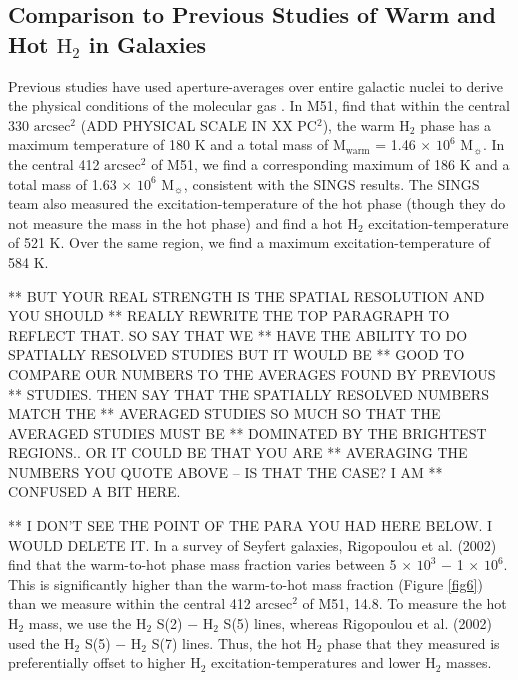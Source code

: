 \documentclass[manuscript]{aastex}
\begin{document}
\subsection{Comparison to Previous Studies of Warm and Hot $\mathrm{H_2}$ in Galaxies}

Previous studies have used aperture-averages over entire galactic
nuclei to derive the physical conditions of the molecular gas
\citep{rig02, hig06, rou07}.  In M51, \citet{rou07} find that within
the central 330 $\mathrm{arcsec^2}$ (ADD PHYSICAL SCALE IN XX PC$^2$),
the warm $\mathrm{H_2}$ phase has a maximum temperature of 180 K and a
total mass of $\mathrm{M_{warm}}$ = 1.46 $\times$ $\mathrm{10^6}$
$\mathrm{M_\sun}$.  In the central 412 $\mathrm{arcsec^2}$ of M51, we
find a corresponding maximum of 186 K and a total mass of 1.63
$\times$ $\mathrm{10^6}$ $\mathrm{M_\sun}$, consistent with the SINGS
results.  The SINGS team also measured the excitation-temperature of
the hot phase (though they do not measure the mass in the hot phase)
and find a hot $\mathrm{H_2}$ excitation-temperature of 521 K.  Over
the same region, we find a maximum excitation-temperature of 584 K.

** BUT YOUR REAL STRENGTH IS THE SPATIAL RESOLUTION AND YOU SHOULD
** REALLY REWRITE THE TOP PARAGRAPH TO REFLECT THAT.  SO SAY THAT WE
** HAVE THE ABILITY TO DO SPATIALLY RESOLVED STUDIES BUT IT WOULD BE
** GOOD TO COMPARE OUR NUMBERS TO THE AVERAGES FOUND BY PREVIOUS
** STUDIES.  THEN SAY THAT THE SPATIALLY RESOLVED NUMBERS MATCH THE
** AVERAGED STUDIES SO MUCH SO THAT THE AVERAGED STUDIES MUST BE
** DOMINATED BY THE BRIGHTEST REGIONS.. OR IT COULD BE THAT YOU ARE
** AVERAGING THE NUMBERS YOU QUOTE ABOVE -- IS THAT THE CASE?  I AM
** CONFUSED A BIT HERE.

** I DON'T SEE THE POINT OF THE PARA YOU HAD HERE BELOW.  I WOULD DELETE IT.  
In a survey of Seyfert galaxies, Rigopoulou et al. (2002) find that the
warm-to-hot phase mass fraction varies between 5 $\times$
$\mathrm{10^3}$ $-$ 1 $\times$ $\mathrm{10^6}$.  This is significantly
higher than the warm-to-hot mass fraction (Figure \ref{fig6}) than we
measure within the central 412 $\mathrm{arcsec^2}$ of M51, 14.8.  To
measure the hot $\mathrm{H_2}$ mass, we use the $\mathrm{H_2}$ S(2)
$-$ $\mathrm{H_2}$ S(5) lines, whereas Rigopoulou et al. (2002) used
the $\mathrm{H_2}$ S(5) $-$ $\mathrm{H_2}$ S(7) lines.  Thus, the hot
$\mathrm{H_2}$ phase that they measured is preferentially offset to
higher $\mathrm{H_2}$ excitation-temperatures and lower $\mathrm{H_2}$
masses.
\end{document}
